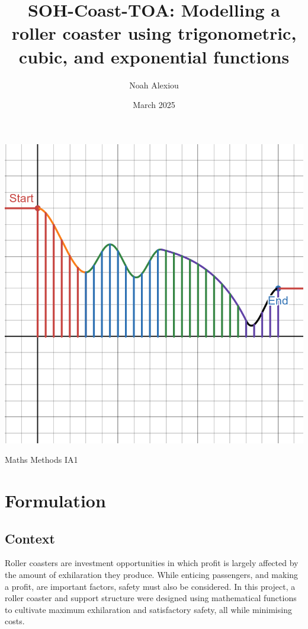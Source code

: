 \documentclass[10pt, letterpaper]{article}
\begin{document}
\begin{titlepage}
	\title{SOH-Coast-TOA: Modelling a roller coaster using trigonometric, cubic, and exponential functions}
	
	\author{Noah Alexiou}


	\date{March 2025}
	
	\maketitle
	\centering
	\includegraphics[width=1\linewidth]{finalgraph.png}
\begin{center}
	\large
	\vfill
	Maths Methods IA1
\end{center}
	
\end{titlepage}


\newpage
\tableofcontents


\newpage


\section{Formulation}
\subsection{Context}
Roller coasters are investment opportunities in which profit is largely affected by the amount of exhilaration they produce. While enticing passengers, and making a profit, are important factors, safety must also be considered. 
In this project, a roller coaster and support structure were designed using mathematical functions to cultivate maximum exhilaration and satisfactory safety, all while minimising costs.
\end{document}
